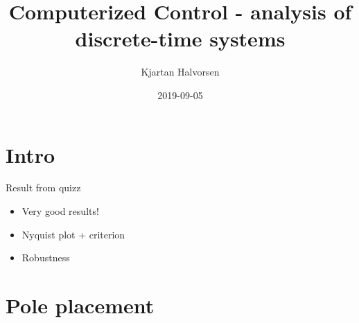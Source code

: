 \documentclass[presentation,aspectratio=169]{beamer}
\author{Kjartan Halvorsen}
\date{2019-09-05}
\title{Computerized Control - analysis of discrete-time systems}
\begin{document}
\maketitle

\section{Intro}
\label{sec:org06d2c71}
\begin{frame}[label={sec:org53fc2d8}]{Result from quizz}
\begin{itemize}
\item Very good results!
\item Nyquist plot + criterion
\item Robustness
\end{itemize}
\end{frame}
\section{Pole placement}
\label{sec:orgc540c2c}
\end{document}
